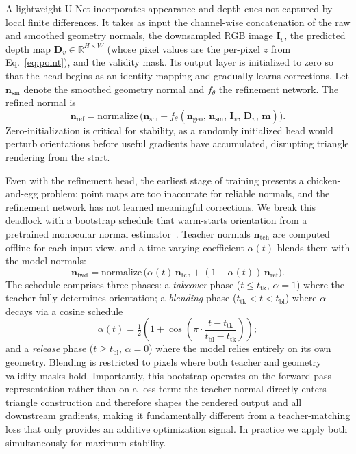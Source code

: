 A lightweight U-Net incorporates appearance and depth cues not captured by local finite differences. It takes as input the channel-wise concatenation of the raw and smoothed geometry normals, the downsampled RGB image $\mathbf{I}_v$, the predicted depth map $\mathbf{D}_v\!\in\!\mathbb{R}^{H\times W}$ (whose pixel values are the per-pixel $z$ from Eq.~\eqref{eq:point}), and the validity mask. Its output layer is initialized to zero so that the head begins as an identity mapping and gradually learns corrections. Let $\mathbf{n}_{\mathrm{sm}}$ denote the smoothed geometry normal and $f_\theta$ the refinement network. The refined normal is
\begin{equation}
    \mathbf{n}_{\mathrm{ref}} = \mathrm{normalize}\,\!\bigl(\mathbf{n}_{\mathrm{sm}} + f_\theta(\mathbf{n}_{\mathrm{geo}},\, \mathbf{n}_{\mathrm{sm}},\, \mathbf{I}_v,\, \mathbf{D}_v,\, \mathbf{m})\bigr).
    \label{eq:refine}
\end{equation}
Zero-initialization is critical for stability, as a randomly initialized head would perturb orientations before useful gradients have accumulated, disrupting triangle rendering from the start.

Even with the refinement head, the earliest stage of training presents a chicken-and-egg problem: point maps are too inaccurate for reliable normals, and the refinement network has not learned meaningful corrections. We break this deadlock with a bootstrap schedule that warm-starts orientation from a pretrained monocular normal estimator~\citep{eftekhar2021omnidata}. Teacher normals $\mathbf{n}_{\mathrm{tch}}$ are computed offline for each input view, and a time-varying coefficient $\alpha(t)$ blends them with the model normals:
\begin{equation}
    \mathbf{n}_{\mathrm{fwd}} = \mathrm{normalize}\,\!\bigl(\alpha(t)\,\mathbf{n}_{\mathrm{tch}} + (1 - \alpha(t))\,\mathbf{n}_{\mathrm{ref}}\bigr).
    \label{eq:blend}
\end{equation}
The schedule comprises three phases: a \emph{takeover} phase ($t \leq t_{\mathrm{tk}}$, $\alpha\!=\!1$) where the teacher fully determines orientation; a \emph{blending} phase ($t_{\mathrm{tk}} < t < t_{\mathrm{bl}}$) where $\alpha$ decays via a cosine schedule
\begin{equation}
    \alpha(t) = \tfrac{1}{2}\!\left(1 + \cos\!\left(\pi \cdot \frac{t - t_{\mathrm{tk}}}{t_{\mathrm{bl}} - t_{\mathrm{tk}}}\right)\right);
    \label{eq:cosine}
\end{equation}
and a \emph{release} phase ($t \geq t_{\mathrm{bl}}$, $\alpha\!=\!0$) where the model relies entirely on its own geometry. Blending is restricted to pixels where both teacher and geometry validity masks hold. Importantly, this bootstrap operates on the forward-pass representation rather than on a loss term: the teacher normal directly enters triangle construction and therefore shapes the rendered output and all downstream gradients, making it fundamentally different from a teacher-matching loss that only provides an additive optimization signal. In practice we apply both simultaneously for maximum stability.

